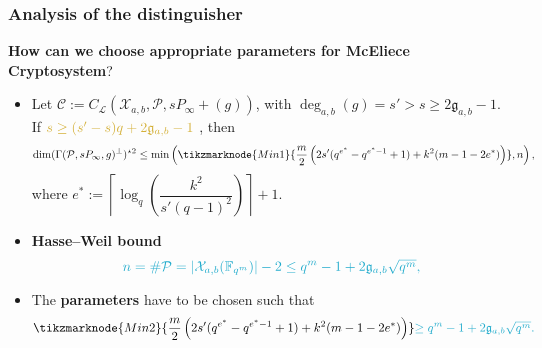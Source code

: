 \documentclass[
10pt, %
%
aspectratio=169, %
]{beamer}
\theoremstyle{plain}%
\theoremstyle{definition}
\theoremstyle{remark}
\newcommand{\calP}{\mathcal{P}}
\newcommand{\calL}{\mathcal{L}}
\newcommand{\calC}{\mathcal{C}}
\newcommand{\calX}{\mathcal{X}}
\newcommand{\fqm}{\mathbb{F}_{q^m}}
\newcommand{\degab}[1]{\deg_{a,b}\left(#1\right)}
\newcommand\highlightnode[2]{ %
	\node (#1-frame)[rounded corners,fit=(#1),inner sep=2pt,fill=#2,fill opacity=0.17] {};
}
\begin{document}
\begin{frame}
	\frametitle{Analysis of the distinguisher}
	\textcolor{applegreen}{\textbf{How can we choose appropriate parameters for McEliece Cryptosystem}?}
	\begin{itemize}
		\item Let $\calC := C_\calL(\calX_{a,b},\calP,sP_\infty +(g))$, with $\degab{g} = s'>s\geq 2\mathfrak{g}_{a,b}-1$. If $\mathcolor{gold}{s \geq (s'-s)q+2\mathfrak{g}_{a,b}-1}$ , then
		\[ \dim (\Gamma(\calP,sP_\infty,g)^{\perp})^{\star 2} \leq \min \left(\tikzmarknode{Min1}{\frac{m}{2}\left(2s'(q^{e^*}-q^{e^*-1}+1)+k^2(m-1-2e^*)  \right)},n\right),\]	
		where $e^* := \left\lceil \log_q\left(\dfrac{k^2}{s'(q-1)^2}\right)\right\rceil+1$.
		\item \textbf{Hasse--Weil bound }
		\[\color{ballblue}{n = \# \calP = |\calX_{a,b}(\fqm)|-2 \leq q^m-1+2\mathfrak{g}_{a,b}\sqrt{q^m}},\]
		\item The \textbf{parameters} have to be chosen such that 
		\[\tikzmarknode{Min2}{\frac{m}{2}\left(2s'(q^{e^*}-q^{e^*-1}+1)+k^2(m-1-2e^*)  \right)}\color{ballblue}{\geq q^m-1+2\mathfrak{g}_{a,b}\sqrt{q^m}}.\]	
		
	\end{itemize}
\end{frame}
\end{document}
